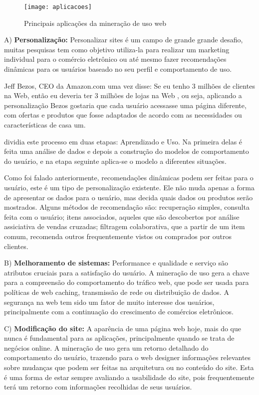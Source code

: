 \begin{figure}[!htb]
\centering
\texttt{[image: aplicacoes]}
\caption{Principais aplicações da mineração de uso web}
\label{Rotulo}
\end{figure}

A) \textbf{Personalização:}
    Personalizar sites é um campo de grande grande desafio, muitas pesquisas tem como objetivo utiliza-la para realizar um marketing individual para o comércio eletrônico ou até mesmo fazer recomendações dinâmicas para os usuários baseado no seu perfil e comportamento de uso.

    Jeff Bezos, CEO da Amazon.com uma vez disse: Se eu tenho 3 milhões de clientes na Web, então eu deveria ter 3 milhões de lojas na Web \cite{Schafer}, ou seja, aplicando a personalização Bezos gostaria que cada usuário acessasse uma página diferente, com ofertas e produtos que fosse adaptados de acordo com as necessidades ou características de casa um.

    \cite{Schafer} dividia este processo em duas etapas: Aprendizado e Uso. Na primeira delas é feita uma análise de dados e depois a construção do modelos de comportamento do usuário, e na etapa seguinte aplica-se o modelo a diferentes situações.

    Como foi falado anteriormente, recomendações dinâmicas podem ser feitas para o usuário, este é um tipo de personalização existente. Ele não muda apenas a forma de apresentar os dados para o usuário, mas decida quais dados ou produtos serão mostrados. Alguns métodos de recomendação são: recuperação simples, consulta feita com o usuário; itens associados, aqueles que são descobertos por análise assiciativa de vendas cruzadas; filtragem colaborativa, que a partir de um item comum, recomenda outros frequentemente vistos ou comprados por outros clientes.

B) \textbf{Melhoramento de sistemas:}
    Performance e qualidade e serviço são atributos cruciais para a satisfação do usuário. A mineração de uso gera a chave para a compreensão do comportamento do tráfico web, que pode ser usada para políticas de web caching, transmissão de rede ou distribuição de dados. A segurança na web tem sido um fator de muito interesse dos usuários, principalmente com a continuação do crescimento de comércios eletrônicos.

C) \textbf{Modificação do site:}
    A aparência de uma página web hoje, mais do que nunca é fundamental para as aplicações, principalmente quando se trata de negócios online. A mineração de uso gera um retorno detalhado do comportamento do usuário, trazendo para o web designer informações relevantes sobre mudanças que podem ser feitas na arquitetura ou no conteúdo do site. Esta é uma forma de estar sempre avaliando a usabilidade do site, pois frequentemente terá um retorno com informações recolhidas de seus usuários.

